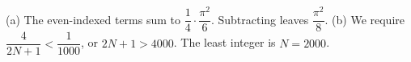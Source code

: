 (a) The even-indexed terms sum to $\dfrac{1}{4}\cdot\dfrac{\pi^2}{6}$. Subtracting leaves $\boxed{\dfrac{\pi^2}{8}}$. (b) We require $\dfrac{4}{2N+1}<\dfrac{1}{1000}$, or $2N+1>4000$. The least integer is $\boxed{N=2000}$.
